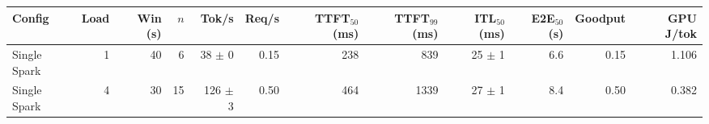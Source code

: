 \begin{tabular}{l r r r r r r r r r r r}
\toprule
Config & Load & Win (s) & $n$ & Tok/s & Req/s & TTFT$_{50}$ (ms) & TTFT$_{99}$ (ms) & ITL$_{50}$ (ms) & E2E$_{50}$ (s) & Goodput & GPU J/tok \\
\midrule
Single Spark & 1 & 40 & 6\rlap{$^\dagger$} & 38 $\pm$ 0 & 0.15 & 238 & 839 & 25 $\pm$ 1 & 6.6 & 0.15 & 1.106 \\
Single Spark & 4 & 30 & 15\rlap{$^\dagger$} & 126 $\pm$ 3 & 0.50 & 464 & 1339 & 27 $\pm$ 1 & 8.4 & 0.50 & 0.382 \\
\bottomrule
\end{tabular}
